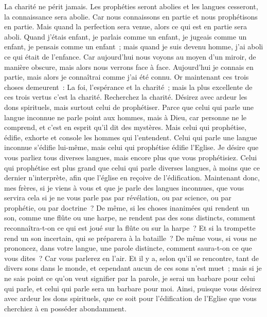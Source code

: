 \begin{multicols}{2}
La charité ne périt jamais. Les prophéties seront abolies et les langues cesseront, la connaissance sera abolie.
Car nous connaissons en partie et nous prophétisons en partie.
Mais quand la perfection sera venue, alors ce qui est en partie sera aboli.
Quand j'étais enfant, je parlais comme un enfant, je jugeais comme un enfant, je pensais comme un enfant~; mais quand je suis devenu homme, j'ai aboli ce qui était de l'enfance.
Car aujourd'hui nous voyons au moyen d'un miroir, de manière obscure, mais alors nous verrons face à face. Aujourd'hui je connais en partie, mais alors je connaîtrai comme j'ai été connu.
Or maintenant ces trois choses demeurent~: La foi, l'espérance et la charité~; mais la plus excellente de ces trois vertus c'est la charité.
\VerseOne{}Recherchez la charité. Désirez avec ardeur les dons spirituels, mais surtout celui de prophétiser.
Parce que celui qui parle une langue inconnue ne parle point aux hommes, mais à Dieu, car personne ne le comprend, et c'est en esprit qu'il dit des mystères.
Mais celui qui prophétise, édifie, exhorte et console les hommes qui l'entendent.
Celui qui parle une langue inconnue s'édifie lui-même, mais celui qui prophétise édifie l'Eglise.
Je désire que vous parliez tous diverses langues, mais encore plus que vous prophétisiez. Celui qui prophétise est plus grand que celui qui parle diverses langues, à moins que ce dernier n'interprète, afin que l'église en reçoive de l'édification.
Maintenant donc, mes frères, si je viens à vous et que je parle des langues inconnues, que vous servira cela si je ne vous parle pas par révélation, ou par science, ou par prophétie, ou par doctrine~?
De même, si les choses inanimées qui rendent un son, comme une flûte ou une harpe, ne rendent pas des sons distincts, comment reconnaîtra-t-on ce qui est joué sur la flûte ou sur la harpe~?
Et si la trompette rend un son incertain, qui se préparera à la bataille~?
De même vous, si vous ne prononcez, dans votre langue, une parole distincte, comment saura-t-on ce que vous dites~? Car vous parlerez en l'air.
Et il y a, selon qu'il se rencontre, tant de divers sons dans le monde, et cependant aucun de ces sons n'est muet~;
mais si je ne sais point ce qu'on veut signifier par la parole, je serai un barbare pour celui qui parle, et celui qui parle sera un barbare pour moi.
Ainsi, puisque vous désirez avec ardeur les dons spirituels, que ce soit pour l'édification de l'Eglise que vous cherchiez à en posséder abondamment.

\end{multicols}
